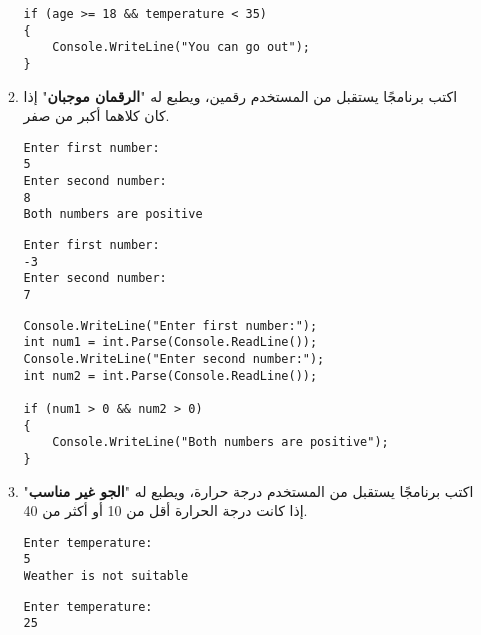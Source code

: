 ﻿\documentclass[12pt]{article}
\begin{document}
\begin{enumerate}[itemsep=3em]
\begin{enumerate}
\begin{boxSolution}
\begin{english}
\begin{verbatim}
if (age >= 18 && temperature < 35)
{
    Console.WriteLine("You can go out");
}
\end{verbatim}
\end{english}
\end{boxSolution}
\clearpage
\fi
\fi

\item
اكتب برنامجًا يستقبل من المستخدم رقمين، ويطبع له "\textbf{الرقمان موجبان}" إذا كان كلاهما أكبر من صفر.
\ifdetailed
\begin{boxExample}[1]
\begin{english}
\begin{verbatim}
Enter first number:
5
Enter second number:
8
Both numbers are positive
\end{verbatim}
\end{english}
\end{boxExample}
\begin{boxExample}[2]
\begin{english}
\begin{verbatim}
Enter first number:
-3
Enter second number:
7
\end{verbatim}
\end{english}
\end{boxExample}

\ifwithsols
\begin{boxSolution}
\begin{english}
\begin{verbatim}
Console.WriteLine("Enter first number:");
int num1 = int.Parse(Console.ReadLine());
Console.WriteLine("Enter second number:");
int num2 = int.Parse(Console.ReadLine());

if (num1 > 0 && num2 > 0)
{
    Console.WriteLine("Both numbers are positive");
}
\end{verbatim}
\end{english}
\end{boxSolution}
\fi
\clearpage
\fi

\item
اكتب برنامجًا يستقبل من المستخدم درجة حرارة، ويطبع له "\textbf{الجو غير مناسب}" إذا كانت درجة الحرارة أقل من 10 أو أكثر من 40.
\ifdetailed
\begin{boxExample}[1]
\begin{english}
\begin{verbatim}
Enter temperature:
5
Weather is not suitable
\end{verbatim}
\end{english}
\end{boxExample}
\begin{boxExample}[2]
\begin{english}
\begin{verbatim}
Enter temperature:
25
\end{verbatim}
\end{english}
\end{boxExample}


\end{enumerate}
\end{enumerate}
\end{document}
